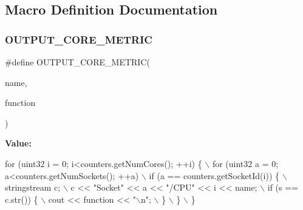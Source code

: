 \subsection{Macro Definition Documentation}
\mbox{\label{pcm-sensor_8cpp_af87f81d4e36dbea17fda4544fedae80b}} 
\subsubsection{O\+U\+T\+P\+U\+T\+\_\+\+C\+O\+R\+E\+\_\+\+M\+E\+T\+R\+IC}
{\footnotesize\ttfamily \#define O\+U\+T\+P\+U\+T\+\_\+\+C\+O\+R\+E\+\_\+\+M\+E\+T\+R\+IC(\begin{DoxyParamCaption}\item[{}]{name,  }\item[{}]{function }\end{DoxyParamCaption})}

{\bfseries Value\+:}
\begin{DoxyCode}
\textcolor{keywordflow}{for} (uint32 i = 0; i<counters.getNumCores(); ++i) \{ \(\backslash\)
                             for (uint32 a = 0; a<counters.getNumSockets(); ++a) \(\backslash\)
                                                  \textcolor{keywordflow}{if} (a == counters.getSocketId(i)) \{ \(\backslash\)
                                                      stringstream c; \(\backslash\)
                                                      c << \textcolor{stringliteral}{"Socket"} << a << \textcolor{stringliteral}{"/CPU"} << i << name; \(\backslash\)
                                                      if (s == c.str()) \{ \(\backslash\)
                                                          cout << \textcolor{keyword}{function} << \textcolor{stringliteral}{"\(\backslash\)n"}; \(\backslash\)
                                                      \} \(\backslash\)
                                                  \} \(\backslash\)
                                                  \}
\end{DoxyCode}
\mbox{\label{pcm-sensor_8cpp_abfcf6ac619060882e6abd536ac9541c4}} 
